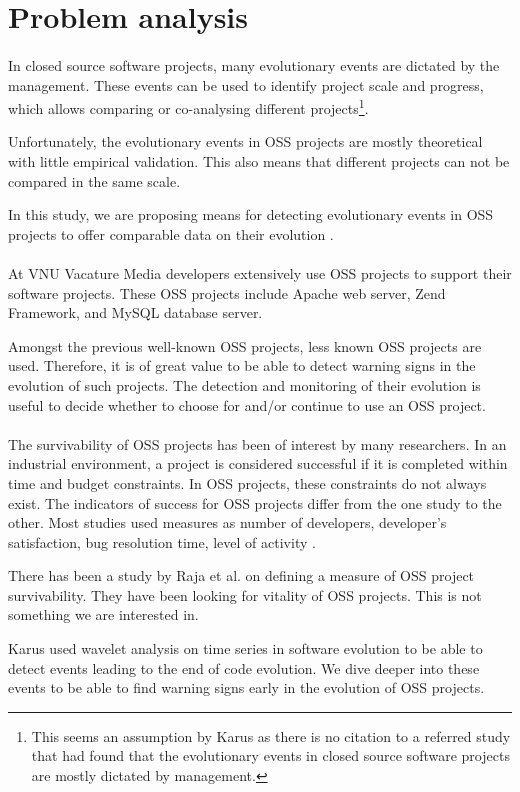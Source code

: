 \section{Problem analysis}
\paragraph{}
In closed source software projects, many evolutionary events are dictated by the
management. These events can be used to identify project scale and progress,
which allows comparing or co-analysing different projects\footnote{This seems
an assumption by Karus as there is no citation to a referred study that had
found that the evolutionary events in closed source software projects are mostly
dictated by management.}.

Unfortunately, the evolutionary events in OSS projects are
mostly theoretical with little empirical validation. This also means that
different projects can not be compared in the same scale.

In this study, we are proposing means for detecting evolutionary events in OSS
projects to offer comparable data on their evolution \cite{karus2013}.

\paragraph{}
At VNU Vacature Media developers extensively use OSS projects to support their
software projects. These OSS projects include Apache web server, Zend Framework,
and MySQL database server.

Amongst the previous well-known OSS projects, less known OSS projects are used.
Therefore, it is of great value to be able to detect warning signs in the
evolution of such projects. The detection and monitoring of their evolution is
useful to decide whether to choose for and/or continue to use an OSS project.

\paragraph{}
The survivability of OSS projects has been of interest by many researchers. In
an industrial environment, a project is considered successful if it is completed
within time and budget constraints. In OSS projects, these constraints do not
always exist. The indicators of success for OSS projects differ from the one
study to the other. Most studies used measures as number of developers,
developer's satisfaction, bug resolution time, level of activity
\cite{samoladas2010}.

There has been a study by Raja et al. \cite{raja2012} on defining a measure of
OSS project survivability. They have been looking for vitality of OSS projects.
This is not something we are interested in.

Karus used wavelet analysis on time series in software evolution to be able to
detect events leading to the end of code evolution. We dive deeper into these
events to be able to find warning signs early in the evolution of OSS projects.
